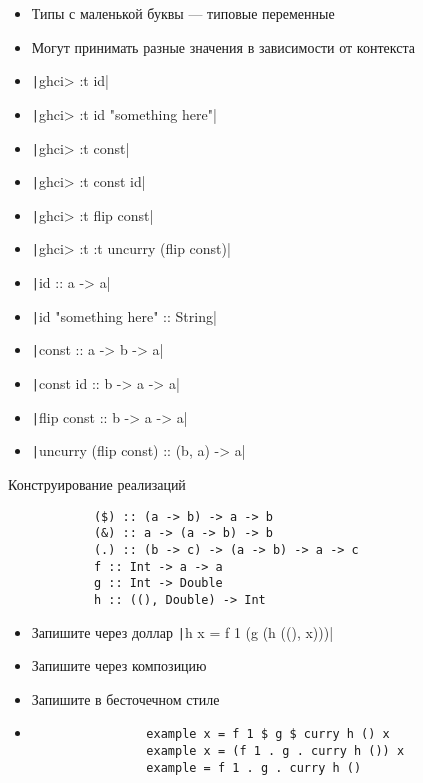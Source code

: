
    \begin{frame}[fragile]{\secname}
        \begin{itemize}
            \item Типы с маленькой буквы --- типовые переменные
            \item Могут принимать разные значения в зависимости от контекста
            \item[\todo] \texttt|ghci> :t id|
            \item[\todo] \texttt|ghci> :t id "something here"|
            \item[\todo] \texttt|ghci> :t const|
            \item[\todo] \texttt|ghci> :t const id|
            \item[\todo] \texttt|ghci> :t flip const|
            \item[\todo] \texttt|ghci> :t :t uncurry (flip const)|
            \item[\answer] \pause \texttt|id :: a -> a|
            \item[\answer] \pause \texttt|id "something here" :: String|
            \item[\answer] \pause \texttt|const :: a -> b -> a|
            \item[\answer] \pause \texttt|const id :: b -> a -> a|
            \item[\answer] \pause \texttt|flip const :: b -> a -> a|
            \item[\answer] \pause \texttt|uncurry (flip const) :: (b, a) -> a|
        \end{itemize}
    \end{frame}
    
    \begin{frame}[fragile]{Конструирование реализаций}
        \begin{verbatim}
            ($) :: (a -> b) -> a -> b
            (&) :: a -> (a -> b) -> b
            (.) :: (b -> c) -> (a -> b) -> a -> c
            f :: Int -> a -> a
            g :: Int -> Double
            h :: ((), Double) -> Int
        \end{verbatim}
        \begin{itemize}
            \item[\todo] Запишите через доллар \texttt|h x = f 1 (g (h ((), x)))|
            \item[\todo] Запишите через композицию
            \item[\todo] Запишите в бесточечном стиле
            \item[\answer] \pause
            \begin{verbatim}
                example x = f 1 $ g $ curry h () x
                example x = (f 1 . g . curry h ()) x
                example = f 1 . g . curry h ()
            \end{verbatim}
        \end{itemize}
    \end{frame}

